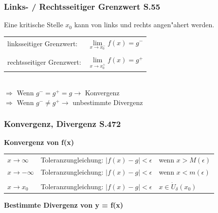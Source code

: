 		\columnbreak

		\subsubsection{Links- / Rechtsseitiger Grenzwert S.55}
			Eine kritische Stelle $x_0$ 	kann von links und rechts angen"ahert werden. \\
				
			\begin{tabular}{ll}
				linksseitiger Grenzwert: & $\lim\limits_{x \to x_0^-} f(x) = g^-$ \\
				\\
				rechtsseitiger Grenzwert: & $\lim\limits_{x \to x_0^+} f(x) = g^+$ \\
			\end{tabular}
			\\ 
			$\Rightarrow$ Wenn $g^- = g^+ = g \rightarrow$ Konvergenz  \\
			$\Rightarrow$ Wenn $g^- \neq g^+ \rightarrow$ unbestimmte Divergenz \\

		\subsubsection{Konvergenz, Divergenz S.472}	
			\textbf{Konvergenz von f(x)} \\
		
				\begin{tabular}{lll}
					$x \rightarrow \infty$  & Toleranzungleichung: $\vert f(x) - g \vert < \epsilon$ & wenn $x > M(\epsilon)$ \\
					$x \rightarrow -\infty$ & Toleranzungleichung: $\vert f(x) - g \vert < \epsilon$ & wenn $x < m(\epsilon)$ \\
					\\
					$x \rightarrow x_0$     & Toleranzungleichung:  $\vert f(x) - g \vert < \epsilon$ & $ x \in \dot{U}_\delta(x_0)$ \\
				\end{tabular}
			
			\textbf{Bestimmte Divergenz von y = f(x)} \\

